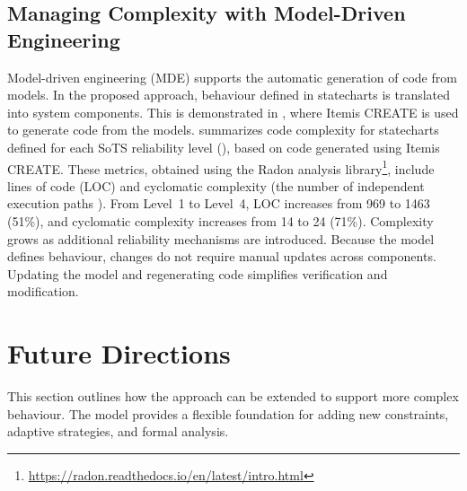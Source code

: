 \subsection{Managing Complexity with Model-Driven Engineering}


Model-driven engineering (MDE) supports the automatic generation of code from models. In the proposed approach, behaviour defined in statecharts is translated into system components. This is demonstrated in , where Itemis CREATE is used to generate code from the models.  summarizes code complexity for statecharts defined for each SoTS reliability level (), based on code generated using Itemis CREATE. These metrics, obtained using the Radon analysis library\footnote{\url{https://radon.readthedocs.io/en/latest/intro.html}}, include lines of code (LOC) and cyclomatic complexity (the number of independent execution paths \cite{coleman1994using, oman1992metrics}). From Level~1 to Level~4, LOC increases from 969 to 1463 (51\%), and cyclomatic complexity increases from 14 to 24 (71\%). Complexity grows as additional reliability mechanisms are introduced. Because the model defines behaviour, changes do not require manual updates across components. Updating the model and regenerating code simplifies verification and modification.

\section{Future Directions}\label{sec:discussion-future}
This section outlines how the approach can be extended to support more complex behaviour. The model provides a flexible foundation for adding new constraints, adaptive strategies, and formal analysis.

